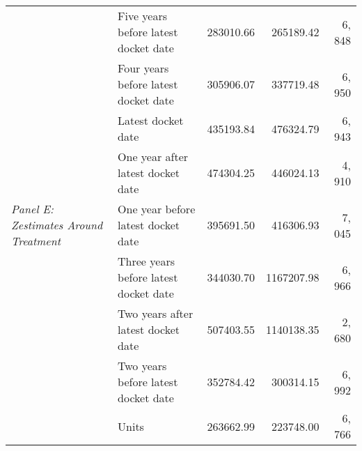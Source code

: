\begin{tabular}{llrrr}
\cline{1-5}
\multirow[c]{9}{*}{\textit{Panel E: Zestimates Around Treatment}} & Five years before latest docket date & 283010.66 & 265189.42 & 6, 848 \\
 & Four years before latest docket date & 305906.07 & 337719.48 & 6, 950 \\
 & Latest docket date & 435193.84 & 476324.79 & 6, 943 \\
 & One year after latest docket date & 474304.25 & 446024.13 & 4, 910 \\
 & One year before latest docket date & 395691.50 & 416306.93 & 7, 045 \\
 & Three years before latest docket date & 344030.70 & 1167207.98 & 6, 966 \\
 & Two years after latest docket date & 507403.55 & 1140138.35 & 2, 680 \\
 & Two years before latest docket date & 352784.42 & 300314.15 & 6, 992 \\
 & Units & 263662.99 & 223748.00 & 6, 766 \\
\cline{1-5}
\bottomrule
\end{tabular}
